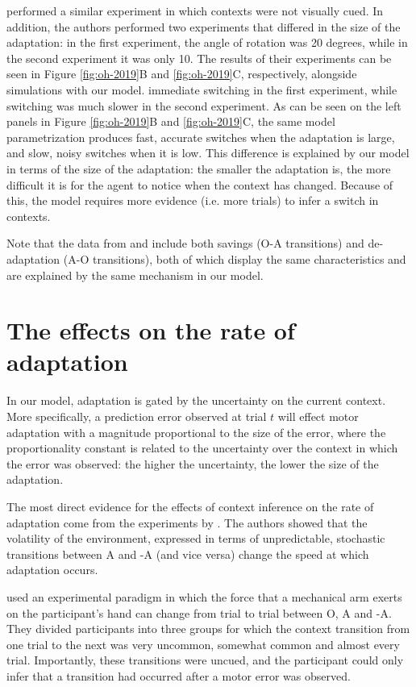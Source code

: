 \documentclass[a4paper,doc,floatsintext,natbib]{apa6}
\def \fref #1{Figure \ref{#1}}     %
\begin{document}
\cite{Oh_Minimizing_2019} performed a similar experiment in which contexts were not visually cued. In addition, the authors performed two experiments that differed in the size of the adaptation: in the first experiment, the angle of rotation was 20 degrees, while in the second experiment it was only 10. The results of their experiments can be seen in \fref{fig:oh-2019}B and \ref{fig:oh-2019}C, respectively, alongside simulations with our model. \cite{Oh_Minimizing_2019} immediate switching in the first experiment, while switching was much slower in the second experiment. As can be seen on the left panels in \fref{fig:oh-2019}B and \ref{fig:oh-2019}C, the same model parametrization produces fast, accurate switches when the adaptation is large, and slow, noisy switches when it is low. This difference is explained by our model in terms of the size of the adaptation: the smaller the adaptation is, the more difficult it is for the agent to notice when the context has changed. Because of this, the model requires more evidence (i.e. more trials) to infer a switch in contexts.

Note that the data from \cite{Oh_Minimizing_2019} and \cite{Kim_Neural_2015} include both savings (O-A transitions) and de-adaptation (A-O transitions), both of which display the same characteristics and are explained by the same mechanism in our model.


\section{The effects on the rate of adaptation}
In our model, adaptation is gated by the uncertainty on the current context. More specifically, a prediction error observed at trial $t$ will effect motor adaptation with a magnitude proportional to the size of the error, where the proportionality constant is related to the uncertainty over the context in which the error was observed: the higher the uncertainty, the lower the size of the adaptation.

The most direct evidence for the effects of context inference on the rate of adaptation come from the experiments by \cite{Herzfeld_memory_2014}. The authors showed that the volatility of the environment, expressed in terms of unpredictable, stochastic transitions between A and -A (and vice versa) change the speed at which adaptation occurs.

\cite{Herzfeld_memory_2014} used an experimental paradigm in which the force that a mechanical arm exerts on the participant's hand can change from trial to trial between O, A and -A. They divided participants into three groups for which the context transition from one trial to the next was very uncommon, somewhat common and almost every trial. Importantly, these transitions were uncued, and the participant could only infer that a transition had occurred after a motor error was observed.
\end{document}
